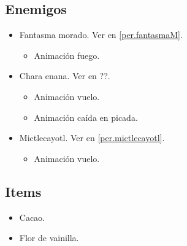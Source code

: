         \subsection{Enemigos}
\begin{itemize}
        \item Fantasma morado. Ver en \ref{per.fantasmaM}.
        \begin{itemize}
				\item Animación fuego.
		\end{itemize}
        \item Chara enana. Ver en ??.
        \begin{itemize}
				\item Animación vuelo.
				\item Animación caída en picada.
		\end{itemize}
		\item Mictlecayotl. Ver en \ref{per.mictlecayotl}.
\begin{itemize}
        \item   Animación vuelo.
\end{itemize}			
\end{itemize}
        \subsection{Items}
\begin{itemize}
        \item Cacao.
        \item Flor de vainilla.
\end{itemize}
